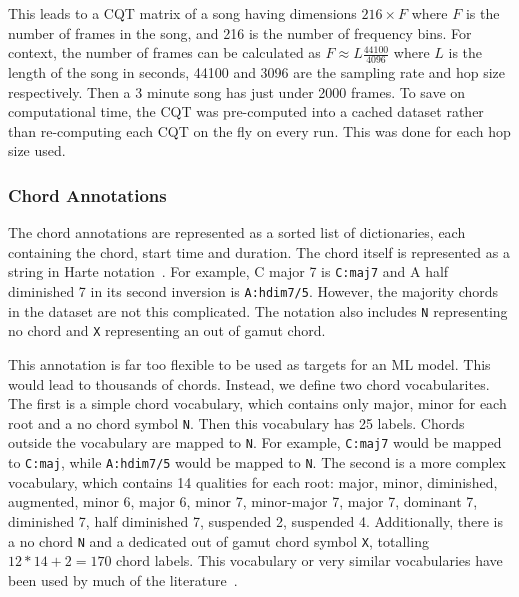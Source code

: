 This leads to a CQT matrix of a song having dimensions $216 \times F$ where $F$ is the number of frames in the song, and 216 is the number of frequency bins. For context, the number of frames can be calculated as $F \approx L \frac{44100}{4096}$ where $L$ is the length of the song in seconds, 44100 and 3096 are the sampling rate and hop size respectively. Then a 3 minute song has just under 2000 frames. To save on computational time, the CQT was pre-computed into a cached dataset rather than re-computing each CQT on the fly on every run. This was done for each hop size used.

\subsubsection{Chord Annotations}

The chord annotations are represented as a sorted list of dictionaries, each containing the chord, start time and duration. The chord itself is represented as a string in Harte notation~\citep{HarteNotation}. For example, C major 7 is \texttt{C:maj7} and A half diminished 7 in its second inversion is \texttt{A:hdim7/5}. However, the majority chords in the dataset are not this complicated. The notation also includes \texttt{N} representing no chord and \texttt{X} representing an out of gamut chord. 

This annotation is far too flexible to be used as targets for an ML model. This would lead to thousands of chords. Instead, we define two chord vocabularites. The first is a simple chord vocabulary, which contains only major, minor for each root and a no chord symbol \texttt{N}. Then this vocabulary has 25 labels. Chords outside the vocabulary are mapped to \texttt{N}. For example, \texttt{C:maj7} would be mapped to \texttt{C:maj}, while \texttt{A:hdim7/5} would be mapped to \texttt{N}. The second is a more complex vocabulary, which contains 14 qualities for each root: major, minor, diminished, augmented, minor 6, major 6, minor 7, minor-major 7, major 7, dominant 7, diminished 7, half diminished 7, suspended 2, suspended 4. Additionally, there is a no chord \texttt{N} and a dedicated out of gamut chord symbol \texttt{X}, totalling $12*14 + 2 = 170$ chord labels. This vocabulary or very similar vocabularies have been used by much of the literature~\citep{StructuredTraining,FourTimelyInsights,ACRLargeVocab1}.

